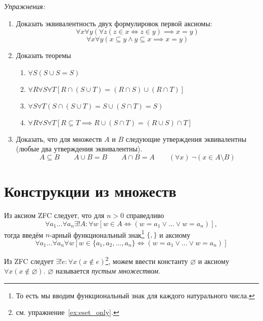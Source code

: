 \newcommand\eset{\varnothing}
\vspace{1em}
{\it Упражнения:}
\begin{enumerate}
	\item{}Доказать эквивалентность двух формулировок первой аксиомы:
	\[
		\forall x\forall y(\forall z(z\in x\iff z\in y)\implies x=y)
	\]
	\[
		\forall x\forall y(x\subseteq y\land y\subseteq x\implies x=y)
	\]

	\item{}Доказать теоремы
	\begin{fullwidth}
		\begin{multicols}{2}
			\begin{enumerate}
				\item{}$\forall S(S\cup S=S)$
				\item{}$\forall R\forall S\forall T[R\cap (S\cup T)=(R\cap S)\cup (R\cap T)]$
				\item{}$\forall S\forall T(S\cap (S\cup T)=S\cup (S\cap T)=S)$
				\item{}$\forall R\forall S\forall T[R\subseteq T
							\implies R\cup (S\cap T)=(R\cup S)\cap T]$
			\end{enumerate}
		\end{multicols}
	\end{fullwidth}

	\item{}Доказать, что для множеств $A$ и $B$ следующие утверждения эквивалентны
	(любые два утверждения эквивалентны).
	\[
		A\subseteq B\qquad A\cup B=B\qquad A\cap B=A
		\qquad (\forall x)~\lnot(x\in A\setminus B)
	\]
\end{enumerate}

\section{Конструкции из множеств}

Из аксиом ZFC следует, что для $n>0$ справедливо
\[
	\forall a_1...\forall a_{n}\exists !A:\forall w
		[w\in A\iff (w=a_1\lor...\lor w=a_{n})],
\]
тогда введём $n$-арный функциональный знак\footnote{
	То есть мы вводим функциональный знак для каждого натурального числа.
} $\{,\}$ и аксиому
\[
	\forall a_1...\forall a_{n}\forall w
	[w\in \{a_1,a_2,...,a_{n}\}\iff (w=a_1\lor ...\lor w=a_{n})]
\]

Из ZFC следует ${\exists !e:\forall x(x\notin e)}$\footnote{
	см. упражнение~\ref{ex:eset_only}.
}, можем ввести константу $\eset$ и аксиому $\forall x(x\notin \eset)$.
$\eset$ называется {\it пустым множеством}.

